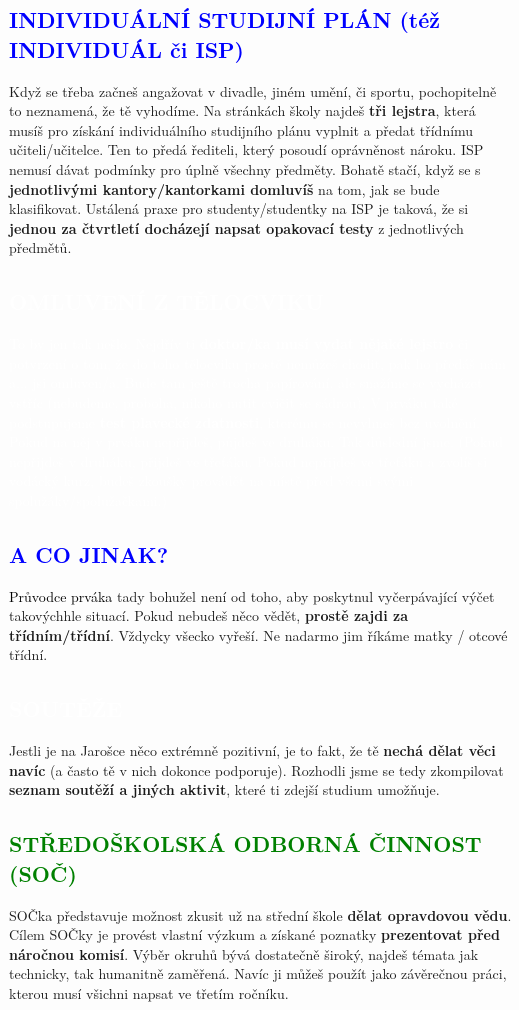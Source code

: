 \documentclass[a5paper, twoside]{article}
\newcommand{\boxik}[2]{
  \begin{tcolorbox}[
    sharp corners,
    colback = #1,
    boxrule = 0pt,
    grow to left by = 25pt,
    grow to right by = 25pt,
    right = 22pt,
    left = 22pt%
  ]
    #2
  \end{tcolorbox}
}
\newcommand{\nadpis}[4]{
  \vspace*{-50pt}
  \begin{tcolorbox}[colback = #2, boxrule = 0pt, grow to left by = #4,  grow to right by = #4, arc=8pt, height = 40pt]
    \vspace*{5pt}
    \centering \section*{\textcolor{#3}{#1}}
  \end{tcolorbox}
}
\newcommand{\podnadpis}[2]{
  \subsection*{\textcolor{#2}{#1}}
}
\begin{document}
\podnadpis{INDIVIDUÁLNÍ STUDIJNÍ PLÁN (též INDIVIDUÁL či ISP)}{blue}
Když se třeba začneš angažovat v divadle, jiném umění, či sportu, pochopitelně to neznamená, že tě vyhodíme. Na stránkách školy najdeš \textbf{tři lejstra}, která musíš pro získání individuálního studijního plánu vyplnit a předat třídnímu učiteli/učitelce. Ten to předá řediteli, který posoudí oprávněnost nároku.
ISP nemusí dávat podmínky pro úplně všechny předměty. Bohatě stačí, když se
s \textbf{jednotlivými kantory/kantorkami domluvíš} na tom, jak se bude klasifikovat. Ustálená praxe pro studenty/studentky na ISP je taková, že si \textbf{jednou za čtvrtletí docházejí napsat opakovací testy} z jednotlivých předmětů.


\smallskip
\boxik{blue}{\vspace{-10pt}\textcolor{white}{\subsection*{OMLUVENÍ Z TĚLOCVIKU}
\medskip
  To by jen tak nešlo. Nejdřív ti \textbf{doktor/ka musí vydat nějaké lejstro} či potvrzení o tom, že do toho tělocviku prostě nemůžeš chodit, pak ho předáš nám a... jsi omluven/a. Bude tam ještě trocha papírování, ale snažíme se vycházet vstříc (nebudeme, proboha, nikoho nutit cvičit se sádrou). V prváku také podstupujeme \textbf{test plavecké zdatnosti}, kterému se nevyhneš bez uvolnění. Pokud na něj v prváku nepřijdeš, půjdeš ve druháku. Tak důslední jsme. (Pokud nepřijdeš v druháku, přijdeš ve třeťáku. Pokud nepřijdeš ve třeťáku a zvolíš si vodácký kurz, budeš zkoušky provádět na místě před všemi svými spolužáky/spolužačkami.)}}

\podnadpis{A CO JINAK?}{blue}
\textcolor{black}{\Kapitan Průvodce prváka} tady bohužel není od toho, aby poskytnul vyčerpávající výčet takovýchhle situací. Pokud nebudeš něco vědět, \textbf{prostě zajdi za třídním/třídní}. Vždycky všecko vyřeší. Ne nadarmo jim říkáme matky / otcové třídní.

\newpage

\nadpis{SOUTĚŽE}{green}{white}{-4.7cm}

\noindent Jestli je na Jarošce něco extrémně pozitivní, je to fakt, že tě \textbf{nechá dělat věci navíc} (a často tě v nich dokonce podporuje). Rozhodli jsme se tedy zkompilovat \textbf{seznam soutěží a jiných aktivit}, které ti zdejší studium umožňuje.

\podnadpis{STŘEDOŠKOLSKÁ ODBORNÁ ČINNOST (SOČ)}{green}
SOČka představuje možnost zkusit už na střední škole \textbf{dělat opravdovou vědu}. Cílem SOČky je provést vlastní výzkum a získané poznatky \textbf{prezentovat před náročnou komisí}. Výběr okruhů bývá dostatečně široký, najdeš témata jak technicky, tak humanitně zaměřená. Navíc ji můžeš použít jako závěrečnou práci, kterou musí všichni napsat ve třetím ročníku.
\end{document}
